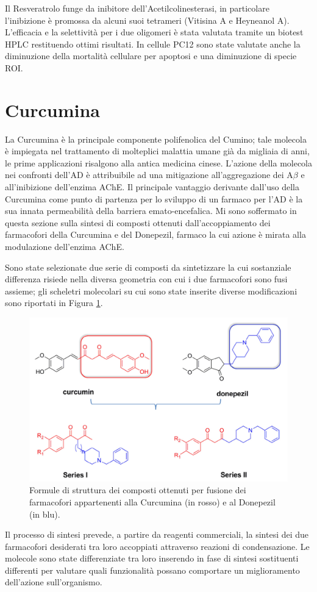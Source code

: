 \documentclass[a4paper, 11pt]{article}
\begin{document}
Il Resveratrolo funge da inibitore dell'Acetilcolinesterasi, in particolare l'inibizione è promossa da alcuni suoi tetrameri (Vitisina A e Heyneanol A). L'efficacia e la selettività per i due oligomeri è stata valutata tramite un biotest HPLC restituendo ottimi risultati. In cellule PC12 sono state valutate anche la diminuzione della mortalità cellulare per apoptosi e una diminuzione di specie ROI.

\section{Curcumina}
La Curcumina è la principale componente polifenolica del Cumino; tale molecola è impiegata nel trattamento di molteplici malattia umane già da migliaia di anni, le prime applicazioni risalgono alla antica medicina cinese.  L'azione della molecola nei confronti dell'AD è attribuibile ad una mitigazione all'aggregazione dei A$\beta$ e all'inibizione dell'enzima AChE. Il principale vantaggio derivante dall'uso della Curcumina come punto di partenza per lo sviluppo di un farmaco per l'AD è la sua innata permeabilità della barriera emato-encefalica. Mi sono soffermato in questa sezione sulla sintesi di composti ottenuti dall'accoppiamento dei farmacofori della Curcumina e del Donepezil, farmaco la cui azione è mirata alla modulazione dell'enzima AChE.

Sono state selezionate due serie di composti da sintetizzare la cui sostanziale differenza risiede nella diversa geometria con cui i due farmacofori sono fusi assieme; gli scheletri molecolari su cui sono state inserite diverse modificazioni sono riportati in Figura \ref{fig:generale_curcdone}.
\begin{figure}[H]
	\centering
	\includegraphics[width=.5\linewidth]{immagini/generale_curcdone.png}
	\caption{Formule di struttura dei composti ottenuti per fusione dei farmacofori appartenenti alla Curcumina (in rosso) e al Donepezil (in blu).}
	\label{fig:generale_curcdone}
\end{figure}

Il processo di sintesi prevede, a partire da reagenti commerciali, la sintesi dei due farmacofori desiderati tra loro accoppiati attraverso reazioni di condensazione. Le molecole sono state differenziate tra loro inserendo in fase di sintesi sostituenti differenti per valutare quali funzionalità possano comportare un miglioramento dell'azione sull'organismo.
\end{document}
